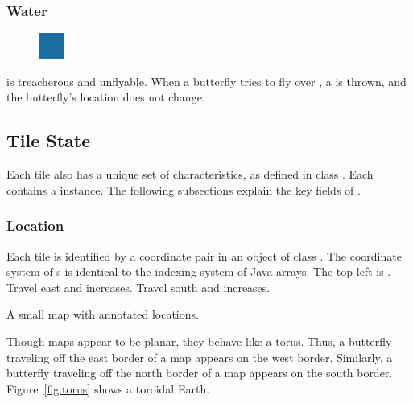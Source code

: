 \documentclass{pset}
\begin{document}
\subsubsection{Water}
\begin{figure}
    \centering
    \vspace{-20pt}
    \includegraphics{img/water.png}
    \vspace{-20pt}
\end{figure}
 is treacherous and unflyable. When a butterfly tries to fly over
, a  is thrown, and the butterfly's
location does not change.
\fi

\ifx \TILESTATE \undefined \else
\subsection{Tile State}
Each tile also has a unique set of characteristics, as defined in class
. Each  contains a  instance. The
following subsections explain the key fields of .

\subsubsection{Location}
Each tile is identified by a  coordinate pair in an object of
class . The coordinate system of s is identical
to the indexing system of Java arrays. The top left  is
\java{[0,0]}. Travel east and  increases. Travel south and 
increases.

\begin{table}[H]
  \centering
  \caption{A small map with annotated locations.}
  \label{table:location}
\end{table}

Though maps appear to be planar, they behave like a torus. Thus, a butterfly
traveling off the east border of a map appears on the west border. Similarly, a
butterfly traveling off the north border of a map appears on the south border.
Figure~\ref{fig:torus} shows a toroidal Earth.
\end{document}
